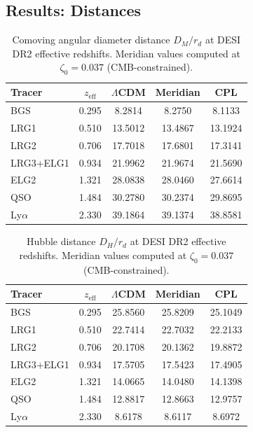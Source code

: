 \subsection{Results: Distances}
\label{sec:2-DESI-distances}

\begin{table}[htbp]
\centering
\caption{Comoving angular diameter distance $D_M/r_d$ at DESI DR2 effective redshifts. Meridian values computed at $\zeta_0 = 0.037$ (CMB-constrained).}
\label{tab:2-DM}
\begin{tabular}{lcccc}
\toprule
Tracer & $z_\mathrm{eff}$ & $\Lambda$CDM & Meridian & CPL \\
\midrule
BGS        & 0.295 &  8.2814 &  8.2750 &  8.1133 \\
LRG1       & 0.510 & 13.5012 & 13.4867 & 13.1924 \\
LRG2       & 0.706 & 17.7018 & 17.6801 & 17.3141 \\
LRG3+ELG1  & 0.934 & 21.9962 & 21.9674 & 21.5690 \\
ELG2       & 1.321 & 28.0838 & 28.0460 & 27.6614 \\
QSO        & 1.484 & 30.2780 & 30.2374 & 29.8695 \\
Ly$\alpha$ & 2.330 & 39.1864 & 39.1374 & 38.8581 \\
\bottomrule
\end{tabular}
\end{table}

\begin{table}[htbp]
\centering
\caption{Hubble distance $D_H/r_d$ at DESI DR2 effective redshifts. Meridian values computed at $\zeta_0 = 0.037$ (CMB-constrained).}
\label{tab:2-DH}
\begin{tabular}{lcccc}
\toprule
Tracer & $z_\mathrm{eff}$ & $\Lambda$CDM & Meridian & CPL \\
\midrule
BGS        & 0.295 & 25.8560 & 25.8209 & 25.1049 \\
LRG1       & 0.510 & 22.7414 & 22.7032 & 22.2133 \\
LRG2       & 0.706 & 20.1708 & 20.1362 & 19.8872 \\
LRG3+ELG1  & 0.934 & 17.5705 & 17.5423 & 17.4905 \\
ELG2       & 1.321 & 14.0665 & 14.0480 & 14.1398 \\
QSO        & 1.484 & 12.8817 & 12.8663 & 12.9757 \\
Ly$\alpha$ & 2.330 &  8.6178 &  8.6117 &  8.6972 \\
\bottomrule
\end{tabular}
\end{table}

